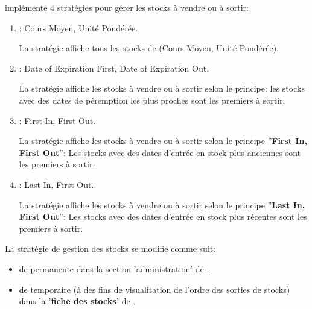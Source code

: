 \label{sec:strategies-gestion-stocks}

\yeren impl\'emente $4$ strat\'egies pour g\'erer les stocks \`a
vendre ou \`a sortir:
\begin{enumerate}[1)]
	\item \cmup: Cours Moyen, Unit\'e Pond\'er\'ee.
	
		La strat\'egie \cmup affiche tous les 
		stocks de \facon (Cours
		Moyen, Unit\'e Pond\'er\'ee).\\
		
	\item \dpfdpo: Date of Expiration First, Date of Expiration Out.
	
		La strat\'egie \dpfdpo affiche les
		stocks \`a vendre ou \`a sortir selon
		le principe: les stocks avec des dates
		de p\'eremption les plus proches sont 
		les premiers \`a sortir.\\
		
	\item \fifo: First In, First Out. 
	
		La strat\'egie \fifo affiche les stocks
		\`a vendre ou \`a sortir selon le principe
		''\textbf{First In, First Out}'':
		Les stocks avec des dates d'entr\'ee en stock
		plus anciennes sont les premiers \`a sortir.\\
		
	\item \lifo: Last In, First Out.
	
		La strat\'egie \lifo affiche les stocks
		\`a vendre ou \`a sortir selon le principe
		''\textbf{Last In, First Out}'': 
		Les stocks avec des dates d'entr\'ee en stock
		plus r\'ecentes sont les premiers \`a sortir.\\
\end{enumerate}
\index{\cmup}
\index{\dpfdpo}
\index{\fifo}
\index{\lifo}

La strat\'egie de gestion des stocks se modifie
comme suit:

\begin{itemize}[]
	\item de \facon permanente dans
		la section 'administration' de \yerenpos.

	\item de \facon temporaire (\`a des fins de
		visualitation de l'ordre des sorties de
		stocks) dans la \fenetre 
		\textbf{'fiche des stocks'} de \yerenpos.
\end{itemize}

